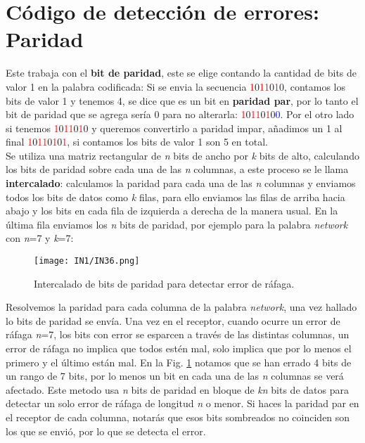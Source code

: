 \documentclass[
	12pt, %
	fleqn, %
	a4paper, %
]{LegrandOrangeBook}
\begin{document}
\section{Código de detección de errores: Paridad}
Este trabaja con el \textbf{bit de paridad}, este se elige contando la cantidad de bits de valor 1 en la palabra codificada: Si se envia la secuencia \textcolor{red}{1}0\textcolor{red}{1}\textcolor{red}{1}0\textcolor{red}{1}0, contamos los bits de valor 1 y tenemos 4, se dice que es un bit en \textbf{paridad par}, por lo tanto el bit de paridad que se agrega sería 0 para no alterarla: \textcolor{red}{1}0\textcolor{red}{1}\textcolor{red}{1}0\textcolor{red}{1}0\textcolor{blue}{0}. Por el otro lado si tenemos \textcolor{red}{1}0\textcolor{red}{1}\textcolor{red}{1}0\textcolor{red}{1}0 y queremos convertirlo a paridad impar, añadimos un 1 al final \textcolor{red}{1}0\textcolor{red}{1}\textcolor{red}{1}0\textcolor{red}{1}0\textcolor{red}{1}, si contamos los bits de valor 1 son 5 en total.\\
Se utiliza una matriz rectangular de \textit{n} bits de ancho por \textit{k} bits de alto, calculando los bits de paridad sobre cada una de las \textit{n} columnas, a este proceso se le llama \textbf{intercalado}: calculamos la paridad para cada una de las \textit{n} columnas y enviamos todos los bits de datos como \textit{k} filas, para ello enviamos las filas de arriba hacia abajo y los bits en cada fila de izquierda a derecha de la manera usual. En la última fila enviamos los \textit{n} bits de paridad, por ejemplo para la palabra \textit{network} con \textit{n}=7 y \textit{k}=7:
\begin{figure}[H]
\centering
\texttt{[image: IN1/IN36.png]}
\caption{Intercalado de bits de paridad para detectar error de ráfaga.}
\label{fig: intercalado}
\end{figure}
Resolvemos la paridad para cada columna de la palabra \textit{network}, una vez hallado lo bits de paridad se envía. Una vez en el receptor, cuando ocurre un error de ráfaga \textit{n}=7, los bits con error se esparcen a través de las distintas columnas, un error de ráfaga no implica que todos estén mal, solo implica que por lo menos el primero y el último están mal. En la Fig. \ref{fig: intercalado} notamos que se han errado 4 bits de un rango de 7 bits, por lo menos un bit en cada una de las \textit{n} columnas se verá afectado. Este metodo usa \textit{n} bits de paridad en bloque de \textit{kn} bits de datos para detectar un solo error de ráfaga de longitud \textit{n} o menor. Si haces la paridad par en el receptor de cada columna, notarás que esos bits sombreados no coinciden son los que se envió, por lo que se detecta el error.
\end{document}
